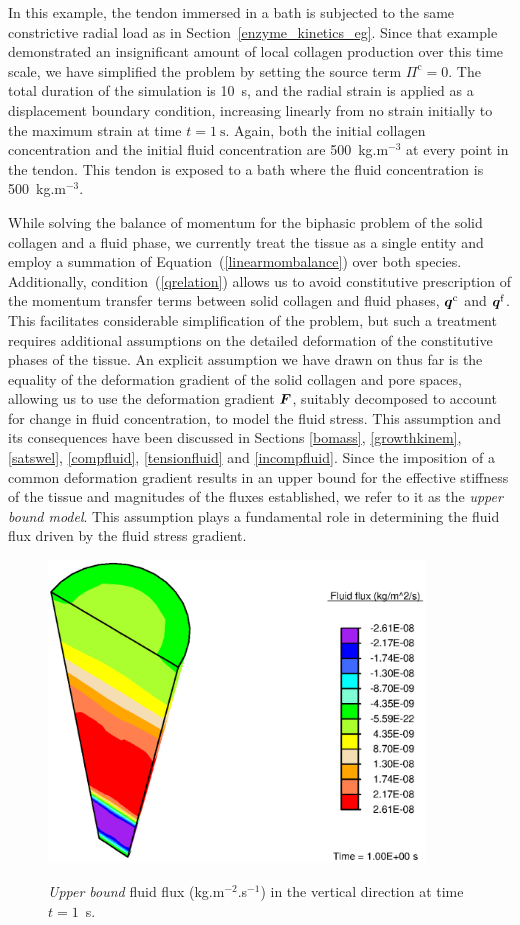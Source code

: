 In this example, the tendon immersed in a bath is subjected to the same
constrictive radial load as in Section~\ref{enzyme_kinetics_eg}. Since
that example demonstrated an insignificant amount of local collagen production
over this time scale, we have simplified the
problem by setting the source term $\Pi^\mathrm{c} = 0$. The total
duration of the simulation is 
10~s, and the radial strain is applied as a displacement boundary
condition, increasing linearly from no strain initially to the maximum
strain at time $t = 1~\mathrm{s}$. Again,
both the initial collagen 
concentration and the initial fluid concentration are 500~kg.m$^{-3}$
at every point in the tendon. This tendon is exposed to a bath where
the fluid concentration is 500~kg.m$^{-3}$.

While solving the balance of momentum for the biphasic problem
of the solid collagen and a fluid phase, we currently treat the
tissue as a single entity and employ a summation of
Equation~(\ref{linearmombalance}) over both species. Additionally,
condition~(\ref{qrelation}) allows us to avoid constitutive
prescription of the momentum transfer terms between solid collagen and
fluid phases,
$\mbox{\boldmath$ q$}^\mathrm{c}$ and $\mbox{\boldmath$ q$}^\mathrm{f}$. This facilitates considerable
simplification of the 
problem, but such a treatment requires additional assumptions on the
detailed deformation of the constitutive phases of the tissue. An
explicit assumption we have drawn on thus far is the equality of
the deformation gradient of the solid collagen and pore spaces,
allowing us to use the deformation gradient
$\mbox{\boldmath$ F$}$, suitably decomposed to account for change in fluid
concentration, to model the fluid stress. This assumption and its 
consequences have been discussed in Sections \ref{bomass},
\ref{growthkinem}, \ref{satswel}, \ref{compfluid}, \ref{tensionfluid}
and \ref{incompfluid}. Since the imposition of a common deformation gradient
results in an upper bound for the 
effective stiffness of the tissue and magnitudes of the fluxes
established, we refer to it as the {\em upper bound model}. This
assumption plays a fundamental role in determining the fluid flux driven
by the fluid stress gradient.

\begin{figure}[ht]
  \centering
      {\includegraphics[width=10.00cm]{images/upper-bound-flux.eps}}
      \caption{{\em Upper bound} fluid flux (kg.m$^{-2}$.s$^{-1}$) in
        the vertical direction at time $t=1$~s.}
      \label{eg2flux}
\end{figure}

